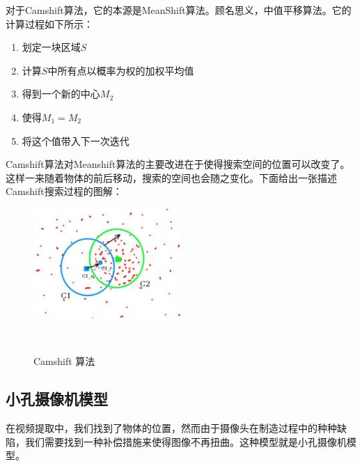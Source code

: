 对于Camshift算法，它的本源是MeanShift算法。顾名思义，中值平移算法。它的计算过程如下所示：
\begin{enumerate}
  \item 划定一块区域$S$
  \item 计算$S$中所有点以概率为权的加权平均值
  \item 得到一个新的中心$M_2$
  \item 使得$M_1=M_2$
  \item 将这个值带入下一次迭代
\end{enumerate}
Camshift算法对Meanshift算法的主要改进在于使得搜索空间的位置可以改变了。这样一来随着物体的前后移动，搜索的空间也会随之变化。下面给出一张描述Camshift搜索过程的图解：
\begin{figure}[h!]

  \centering
    \includegraphics[width=0.5\textwidth]{../Pictures/camshift.jpg}
    \caption{Camshift 算法}\\
\end{figure}
\subsection{小孔摄像机模型}
在视频提取中，我们找到了物体的位置，然而由于摄像头在制造过程中的种种缺陷，我们需要找到一种补偿措施来使得图像不再扭曲。这种模型就是小孔摄像机模型。

